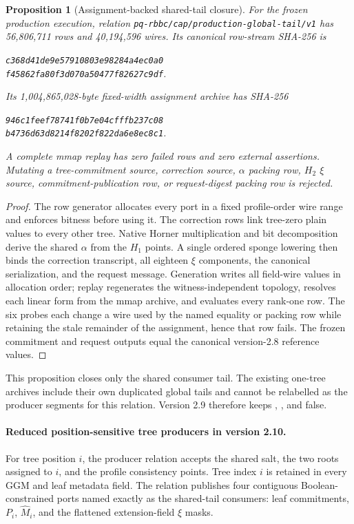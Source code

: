 \documentclass[11pt]{article}
\newtheorem{proposition}[definition]{Proposition}
\begin{document}
\begin{proposition}[Assignment-backed shared-tail closure]
For the frozen production execution, relation
\texttt{pq-rbbc/cap/production-global-tail/v1} has 56,806,711 rows and
40,194,596 wires.  Its canonical row-stream SHA-256 is
\begin{center}\small
\texttt{c368d41de9e57910803e98284a4ec0a0}\\
\texttt{f45862fa80f3d070a50477f82627c9df}.
\end{center}
Its 1,004,865,028-byte fixed-width assignment archive has SHA-256
\begin{center}\small
\texttt{946c1feef78741f0b7e04cfffb237c08}\\
\texttt{b4736d63d8214f8202f822da6e8ec8c1}.
\end{center}
A complete mmap replay has
zero failed rows and zero external assertions.  Mutating a tree-commitment
source, correction source, $\alpha$ packing row, $H_2$ $\xi$ source,
commitment-publication row, or request-digest packing row is rejected.
\end{proposition}
\begin{proof}
The row generator allocates every port in a fixed profile-order wire range and
enforces bitness before using it.  The correction rows link tree-zero plain
values to every other tree.  Native Horner multiplication and bit decomposition
derive the shared $\alpha$ from the $H_1$ points.  A single ordered sponge
lowering then binds the correction transcript, all eighteen $\xi$ components,
the canonical serialization, and the request message.  Generation writes all
field-wire values in allocation order; replay regenerates the witness-independent
topology, resolves each linear form from the mmap archive, and evaluates every
rank-one row.  The six probes each change a wire used by the named equality or
packing row while retaining the stale remainder of the assignment, hence that
row fails.  The frozen commitment and request outputs equal the canonical
version-2.8 reference values.
\end{proof}

This proposition closes only the shared consumer tail.  The existing one-tree
archives include their own duplicated global tails and cannot be relabelled as
the producer segments for this relation.  Version 2.9 therefore keeps
,
, and
 false.

\paragraph{Reduced position-sensitive tree producers in version 2.10.}
For tree position $i$, the producer relation accepts the shared salt, the two
roots assigned to $i$, and the profile consistency points.  Tree index $i$ is
retained in every GGM and leaf metadata field.  The relation publishes four
contiguous Boolean-constrained ports named exactly as the shared-tail
consumers: leaf commitments, $P_i$, $\widehat M_i$, and the flattened
extension-field $\xi$ masks.
\end{document}
